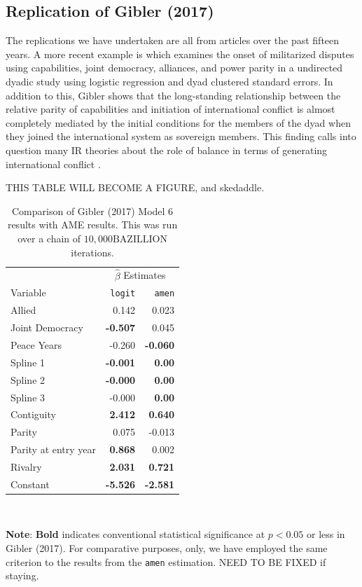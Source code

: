 \subsection{Replication of Gibler (2017)}


The replications we have undertaken are all from articles over the past fifteen years.  A more recent example is \citet{gibler:2017} which examines the onset of militarized disputes using capabilities, joint democracy, alliances, and power parity in a undirected dyadic study using logistic regression and dyad clustered standard errors.   In addition to this, Gibler shows that the long-standing relationship between the relative parity of capabilities and initiation of international conflict is almost completely mediated by the initial conditions for the members of the dyad when they joined the international system as sovereign members. This finding calls into question many IR theories about the role of balance in terms of generating international conflict \citep{organski:1958}.


THIS TABLE WILL BECOME A FIGURE, and skedaddle. 

\begin{table}
\begin{center}
\caption{Comparison of Gibler (2017) Model 6 results with AME results. This was run over a chain of $10,000 \text{BAZILLION}$ iterations.  \label{tab:gibme}}
\begin{tabular}{lrr} \toprule
& \multicolumn{2}{c}{$\hat{\beta}$ Estimates}\\ \cmidrule{2-3}
Variable & \texttt{logit} & \texttt{amen} \\ \midrule
Allied & 0.142&  0.023 \\
Joint Democracy &\bf -0.507&  0.045 \\
Peace Years \bf &-0.260& \bf -0.060 \\
Spline 1 &\bf -0.001& \bf 0.00 \\
Spline 2&\bf -0.000& \bf 0.00\\
Spline 3 &-0.000& \bf 0.00\\ 
Contiguity &\bf 2.412& \bf 0.640 \\
Parity &0.075&  -0.013 \\
Parity at entry year&\bf 0.868&  0.002 \\ 
Rivalry &\bf 2.031&\bf 0.721\\ 
Constant &\bf -5.526 & \bf  -2.581\\ \bottomrule
\end{tabular}\\
\end{center}
{\bf Note}: {\bf Bold} indicates conventional statistical significance at $p < 0.05$ or less in Gibler (2017). For comparative purposes, only, we have employed the same criterion to the results from the \texttt{amen} estimation. NEED TO BE FIXED if staying.
\end{table}

